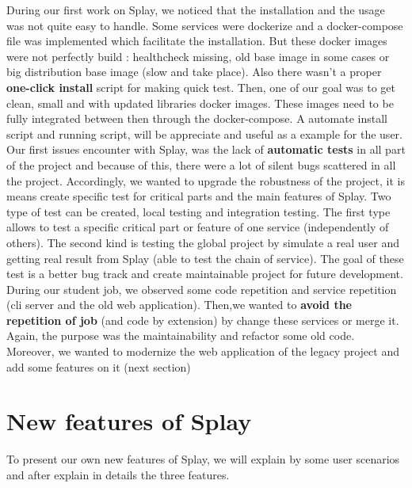 \documentclass{eplmastersthesis}
\begin{document}
      During our first work on Splay, we noticed that the installation and the usage was not quite easy to handle. Some services were dockerize and a docker-compose file was implemented which facilitate the installation. But these docker images were not perfectly build : healthcheck missing, old base image in some cases or big distribution base image (slow and take place). Also there wasn't a proper \textbf{one-click install} script for making quick test. Then, one of our goal was to get clean, small and with updated libraries docker images. These images need to be fully integrated between then through the docker-compose. A automate install script and running script, will be appreciate and useful as a example for the user.\\

      Our first issues encounter with Splay, was the lack of \textbf{automatic tests} in all part of the project and because of this, there were a lot of silent bugs scattered in all the project. Accordingly, we wanted to upgrade the robustness of the project, it is means create specific test for critical parts and the main features of Splay. Two type of test can be created, local testing and integration testing. The first type allows to test a specific critical part or feature of one service (independently of others). The second kind is testing the global project by simulate a real user and getting real result from Splay (able to test the chain of service). The goal of these test is a better bug track and create maintainable project for future development.\\

      During our student job, we observed some code repetition and service repetition (cli server and the old web application). Then,we wanted to \textbf{avoid the repetition of job} (and code by extension) by change these services or merge it. Again, the purpose was the maintainability and refactor some old code. Moreover, we wanted to modernize the web application of the legacy project and add some features on it (next section)


    \section{New features of Splay}

     To present our own new features of Splay, we will explain by some user scenarios and after explain in details the three features.
\end{document}
